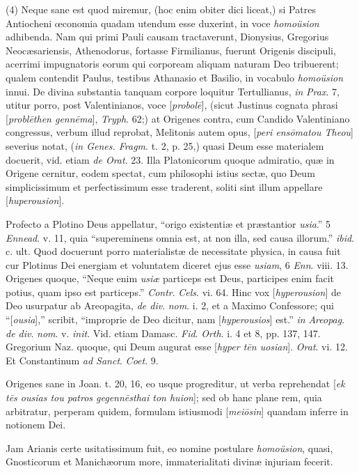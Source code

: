(4) Neque sane est quod miremur, (hoc enim obiter
dici liceat,) si Patres Antiocheni œconomia quadam utendum esse
duxerint, in voce \emph{homoüsion} adhibenda. Nam qui primi Pauli
causam tractaverunt, Dionysius, Gregorius Neocæsariensis, Athenodorus,
fortasse Firmilianus, fuerunt Origenis discipuli, acerrimi
impugnatoris eorum qui corpoream aliquam naturam Deo tribuerent;
qualem contendit Paulus, testibus Athanasio et Basilio, in vocabulo \emph{homoüsion}
innui. De divina substantia tanquam corpore loquitur Tertullianus, \emph{in}
\emph{Prax}. 7, utitur porro, post Valentinianos, voce [\emph{probol\={e}}],
(sicut Justinus cognata phrasi [\emph{probl\={e}then genn\={e}ma}],
\emph{Tryph}. 62;) at Origenes contra, cum Candido Valentiniano
congressus, verbum illud reprobat, Melitonis autem opus, [\emph{peri ens\={o}matou
Theou}] severius notat, (\emph{in Genes. Fragm}. t. 2, p. 25,)
quasi Deum esse materialem docuerit, vid. etiam \emph{de Orat}. 23.
Illa Platonicorum quoque admiratio, quæ in Origene cernitur,
eodem spectat, cum philosophi istius sectæ, quo Deum simplicissimum
et perfectissimum esse traderent, soliti sint illum appellare [\emph{huperousion}].

Profecto a Plotino Deus appellatur, ``origo
existentiæ et præstantior \emph{usia}.'' 5 \emph{Ennead}. v. 11, quia
``supereminens omnia est, at non illa, sed causa illorum.'' \emph{ibid}.
c. ult. Quod docuerunt porro materialistæ de necessitate physica, in
causa fuit cur Plotinus Dei energiam et voluntatem diceret ejus esse \emph{usiam},
6 \emph{Enn}. viii. 13. Origenes quoque, ``Neque enim \emph{usiæ}
particeps est Deus, participes enim facit potius, quam ipso est
particeps.'' \emph{Contr}. \emph{Cels}. vi. 64. Hinc vox [\emph{hyperousion}]
de Deo usurpatur ab Areopagita, \emph{de div}. \emph{nom}. i. 2, et a
Maximo Confessore; qui ``[\emph{ousia}],'' scribit, ``improprie de Deo
dicitur, nam [\emph{hyperousios}] est.'' \emph{in} \emph{Areopag}. \emph{de
div}. \emph{nom}. v. \emph{init}. Vid. etiam Damasc. \emph{Fid}. \emph{Orth}.
i. 4 et 8, pp. 137, 147. Gregorium Naz. quoque, qui Deum augurat esse
[\emph{hyper t\={e}n uosian}]. \emph{Orat}. vi. 12. Et Constantinum
\emph{ad Sanct}. \emph{Coet}. 9.

Origenes sane in Joan. t. 20, 16, eo usque
progreditur, ut verba reprehendat [\emph{ek t\={e}s ousias tou patros
gegenn\={e}sthai ton huion}]; sed ob hanc plane rem, quia
arbitratur, perperam quidem, formulam istiusmodi [\emph{mei\={o}sin}]
quandam inferre in notionem Dei.

Jam Arianis certe usitatissimum fuit, eo nomine
postulare \emph{homoüsion}, quasi, Gnosticorum et Manichæorum more,
immaterialitati divinæ injuriam fecerit.

